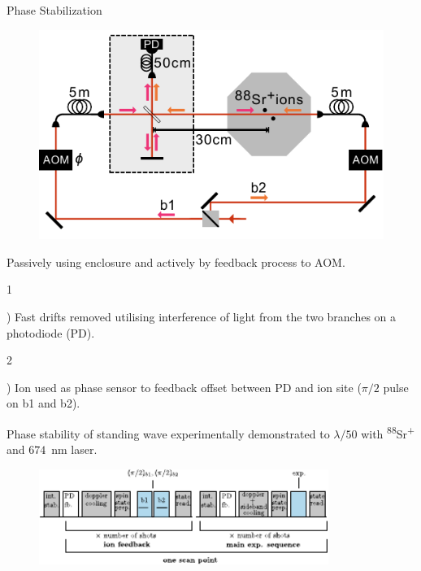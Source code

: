 \documentclass[final]{beamer}
\newcommand{\SubItem}[1]{
    {\setlength\itemindent{15pt} \item[] #1}
}
\begin{document}
\begin{frame}{}
\begin{center}
\begin{columns}[t]
\begin{column}{0.49\textwidth}
    \begin{alertblock}{Phase Stabilization}
      \begin{minipage}{0.47\linewidth}
      \begin{figure}
        \includegraphics[width=1.05\textwidth]{./figs/setup+beams_horizontal_poster.pdf}
      \end{figure}

      \end{minipage}
      \begin{minipage}{0.53\linewidth}
      \begin{itemize}
      \item Passively using enclosure and actively by feedback process to AOM.\\
      \SubItem 1) Fast drifts removed utilising interference of light
            from the two branches on a photodiode (PD).\\

      \SubItem 2) Ion used as phase
            sensor to feedback offset between PD and ion site ($\pi/2$ pulse on b1 and b2). \\
      \item Phase stability of standing wave experimentally
        demonstrated to $\lambda/50$ with
        \textsuperscript{88}Sr\textsuperscript{+} and $674$~nm laser.
      \end{itemize}
      \end{minipage}
      \vspace*{-1em}
      \begin{figure}
        \includegraphics[width=0.84\textwidth]{./figs/beam_seq.pdf}
      \end{figure}


\end{alertblock}
\end{column}
\end{columns}
\end{center}
\end{frame}
\end{document}
